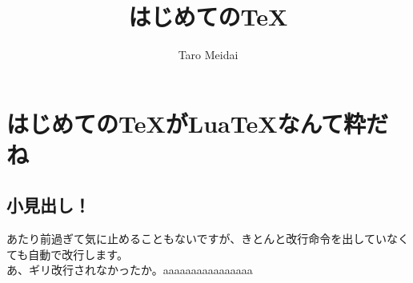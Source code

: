 \documentclass{ltjsarticle}
\begin{document}
\title{はじめての\TeX }
\author{Taro Meidai}
\maketitle
\section{はじめての\TeX がLua\TeX なんて粋だね}

\subsection{小見出し！}
あたり前過ぎて気に止めることもないですが、きとんと改行命令を出していなくても自動で改行します。
\\あ、ギリ改行されなかったか。aaaaaaaaaaaaaaaa
\end{document}
